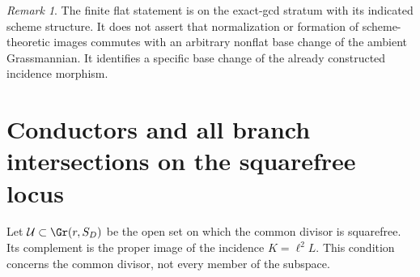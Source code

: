 \documentclass[11pt,reqno]{amsart}
\numberwithin{equation}{section}
\theoremstyle{definition}\newtheorem{definition}[theorem]{Definition}
\theoremstyle{remark}\newtheorem{remark}[theorem]{Remark}
\begin{document}
\begin{remark}
The finite flat statement is on the exact-gcd stratum with its indicated
scheme structure. It does not assert that normalization or formation of
scheme-theoretic images commutes with an arbitrary nonflat base change
of the ambient Grassmannian. It identifies a specific base change of
the already constructed incidence morphism.
\end{remark}


\section{Conductors and all branch intersections on the squarefree locus}
\label{sec:squarefree-v153}
Let $\mathcal U\subset\Gr(r,S_D)$ be the open set on which the common
divisor is squarefree. Its complement is the proper image of the
incidence $K=\ell^2L$. This condition concerns the common divisor,
not every member of the subspace.
\end{document}
